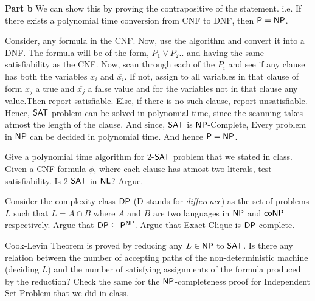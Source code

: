 \documentclass[12pt]{exam}
\begin{document}
\begin{questions}
\begin{solution}
\textbf{Part b} \newline
We can show this by proving the contrapositive of the statement. i.e. If there exists a polynomial time conversion from {\sc CNF} to {\sc DNF}, then ${\mathsf{P}} = {\mathsf{NP}}$.
\newline

Consider, any formula in the {\sc CNF}. Now, use the algorithm and convert it into a {\sc DNF}. The formula will be of the form, $P_{1} \vee P_{2} ..$
and having the same satisfiability as the {\sc CNF}. Now, scan through each of the $P_{i}$ and see if any clause has both the variables $x_{i}$ and $\overline{x_{i}}$.
If not, assign to all variables in that clause of form $x_{j}$ a true and $\overline{x_{j}}$ a false value and for the variables not in that clause any value.Then report satisfiable. Else, if there is no such clause, report unsatisfiable. \newline
Hence, ${\mathsf{SAT}}$ problem can be solved in polynomial time, since the scanning takes atmost the length of the clause. And since, ${\mathsf{SAT}}$ is ${\mathsf{NP}}$-Complete,
Every problem in ${\mathsf{NP}}$ can be decided in polynomial time. And hence ${\mathsf{P}} = {\mathsf{NP}}$.

\end{solution}


\question
Give a polynomial time algorithm for 2-${\mathsf{SAT}}$ problem that we stated in class. Given a CNF formula $\phi$, where each clause has atmost two literals, test satisfiability. Is 2-${\mathsf{SAT}}$ in ${\mathsf{NL}}$? Argue.

\question
Consider the complexity class ${\mathsf{DP}}$ ({\sc D} stands for \textit{difference}) as the set of problems $L$ such that $L = A \cap B$ where $A$ and $B$ are two languages in ${\mathsf{NP}}$ and ${\mathsf{co}}{\mathsf{NP}}$ respectively. Argue that ${\mathsf{DP}} \subseteq {\ensuremath{\mathsf{P}}}^{{\mathsf{NP}}}$. Argue that {\sc Exact-Clique} is ${\mathsf{DP}}$-complete.

\question
Cook-Levin Theorem is proved by reducing any $L \in {\ensuremath{\mathsf{NP}}}$ to ${\mathsf{SAT}}$. Is there any relation between the number of accepting paths of the non-deterministic machine (deciding $L$) and the number of satisfying assignments of the formula produced by the reduction? Check the same for the ${\mathsf{NP}}$-completeness proof for {\sc Independent Set Problem} that we did in class.

\end{questions}

%
\end{document}
